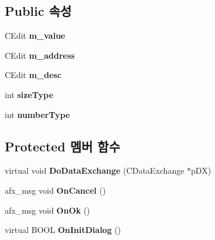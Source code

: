 \subsection*{Public 속성}
\begin{DoxyCompactItemize}
\item 
\mbox{\label{class_add_g_b_cheat_ac5705ad3d8964adb59d62c51dd60a0fc}} 
C\+Edit {\bfseries m\+\_\+value}
\item 
\mbox{\label{class_add_g_b_cheat_af68f821a3073c6a01f1c8760dab628ee}} 
C\+Edit {\bfseries m\+\_\+address}
\item 
\mbox{\label{class_add_g_b_cheat_ae1711f59505d7d442a6572a346993cd2}} 
C\+Edit {\bfseries m\+\_\+desc}
\item 
\mbox{\label{class_add_g_b_cheat_ae0603ce2570d5b09a64f4bd6c2107962}} 
int {\bfseries size\+Type}
\item 
\mbox{\label{class_add_g_b_cheat_ab49fa34156026418e26edf606aa82b1a}} 
int {\bfseries number\+Type}
\end{DoxyCompactItemize}
\subsection*{Protected 멤버 함수}
\begin{DoxyCompactItemize}
\item 
\mbox{\label{class_add_g_b_cheat_ab90d0a5d50911d10eec2706250882d6f}} 
virtual void {\bfseries Do\+Data\+Exchange} (C\+Data\+Exchange $\ast$p\+DX)
\item 
\mbox{\label{class_add_g_b_cheat_ac2eb6674e040b6a8af227e6517f857e8}} 
afx\+\_\+msg void {\bfseries On\+Cancel} ()
\item 
\mbox{\label{class_add_g_b_cheat_aef6d73f3cdf51e28bbba9f7e14b21941}} 
afx\+\_\+msg void {\bfseries On\+Ok} ()
\item 
\mbox{\label{class_add_g_b_cheat_a97210ad566b117af4994adac5d954e94}} 
virtual B\+O\+OL {\bfseries On\+Init\+Dialog} ()
\end{DoxyCompactItemize}
